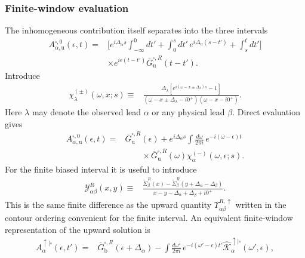\documentclass[
 reprint,
 superscriptaddress,
 amsmath,amssymb,
 aps,prb,
 longbibliography,
 floatfix
]{revtex4-2}
\begin{document}
\subsubsection{Finite-window evaluation}

The inhomogeneous contribution itself separates into the three intervals
\begin{align*}
A_{\alpha,\mathrm u}^{\square,0}
(\epsilon,t)
={}&
\Bigg[
e^{i\Delta_\alpha s}
\int_{-\infty}^{0}dt'
+
\int_0^sdt'\,
e^{i\Delta_\alpha(s-t')}
+
\int_s^t dt'
\Bigg]
\\
&\times
e^{i\epsilon(t-t')}
\overline G_{\mathrm u}^{\square,R}(t-t').
\end{align*}
Introduce
\begin{equation*}
\begin{aligned}
\chi_\lambda^{(\pm)}(\omega,x;s)
\equiv{}&
\frac{
\Delta_\lambda
\left[
e^{i(\omega-x\pm\Delta_\lambda)s}
-1
\right]
}
{
(\omega-x\pm\Delta_\lambda-i0^+)
(\omega-x-i0^+)
}.
\end{aligned}
\end{equation*}
Here $\lambda$ may denote the observed lead $\alpha$ or any physical lead $\beta$. Direct evaluation gives
\begin{equation*}
\begin{aligned}
A_{\alpha,\mathrm u}^{\square,0}
(\epsilon,t)
={}&
\overline G_{\mathrm u}^{\square,R}(\epsilon)
+
e^{i\Delta_\alpha s}
\int\frac{d\omega}{2\pi i}\,
e^{-i(\omega-\epsilon)t}
\\
&\qquad\times
\overline G_{\mathrm u}^{\square,R}(\omega)
\chi_\alpha^{(-)}
(\omega,\epsilon;s).
\end{aligned}
\end{equation*}
For the finite biased interval it is useful to introduce
\begin{equation*}
\begin{aligned}
\mathcal Y_{\alpha\beta}^R(x,y)
\equiv{}&
\frac{
\widetilde\Sigma_\beta^R(x)
-
\widetilde\Sigma_\beta^R
(y+\Delta_\alpha-\Delta_\beta)
}
{
x-y-\Delta_\alpha+\Delta_\beta+i0^+
}.
\end{aligned}
\end{equation*}
This is the same finite difference as the upward quantity $\Upsilon_{\alpha\beta}^{R,\uparrow}$ written in the contour ordering convenient for the finite interval. An equivalent finite-window representation of the upward solution is
\begin{equation*}
\begin{aligned}
A_\alpha^{\uparrow|\square}(\epsilon,t')
={}&
\overline G_{\mathrm b}^{\square,R}
(\epsilon+\Delta_\alpha)
-
\int\frac{d\omega'}{2\pi i}\,
e^{-i(\omega'-\epsilon)t'}
\widehat{\mathcal K}_\alpha^{\uparrow|\square}
(\omega',\epsilon),
\end{aligned}
\end{equation*}
\end{document}
